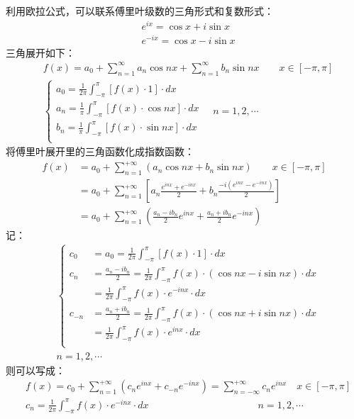 利用欧拉公式，可以联系傅里叶级数的三角形式和复数形式：
\begin{align*}
&e^{ix}=\cos x+i\sin x \\
&e^{-ix}=\cos x-i\sin x
\end{align*}
三角展开如下：
\begin{align*}
&f\left( x \right) =a_0+\sum_{n=1}^{\infty}{a_n\cos nx}+\sum_{n=1}^{\infty}{b_n\sin nx} \qquad x\in \left[ -\pi ,\pi \right] \\
&\begin{cases}
	a_0=\frac{1}{2\pi}\int_{-\pi}^{\pi}{\left[ f\left( x \right) \cdot 1 \right] \cdot dx}\\
	a_n=\frac{1}{\pi}\int_{-\pi}^{\pi}{\left[ f\left( x \right) \cdot \cos nx \right] \cdot dx}\\
	b_n=\frac{1}{\pi}\int_{-\pi}^{\pi}{\left[ f\left( x \right) \cdot \sin nx \right] \cdot dx}\\
\end{cases} \quad n=1,2,\cdots
\end{align*}
将傅里叶展开里的三角函数化成指数函数：
\begin{align*}
f\left( x \right) &=a_0+\sum_{n=1}^{+\infty}{\left( a_n\cos nx+b_n\sin nx \right)} \qquad x\in \left[ -\pi ,\pi \right] \\
&=a_0+\sum_{n=1}^{+\infty}{\left[ a_n\frac{e^{inx}+e^{-inx}}{2}+b_n\frac{-i\left( e^{inx}-e^{-inx} \right)}{2} \right]} \\
&=a_0+\sum_{n=1}^{+\infty}{\left( \frac{a_n-ib_n}{2}e^{inx}+\frac{a_n+ib_n}{2}e^{-inx} \right)}
\end{align*}
记：
\begin{align*}
&\left\{ \begin{aligned}
	c_0&=a_0=\frac{1}{2\pi}\int_{-\pi}^{\pi}{\left[ f\left( x \right) \cdot 1 \right] \cdot dx}\\
	c_n&=\frac{a_n-ib_n}{2}=\frac{1}{2\pi}\int_{-\pi}^{\pi}{f\left( x \right) \cdot \left( \cos nx-i\sin nx \right) \cdot dx}\\
	&=\frac{1}{2\pi}\int_{-\pi}^{\pi}{f\left( x \right) \cdot e^{-inx}\cdot dx}\\
	c_{-n}&=\frac{a_n+ib_n}{2}=\frac{1}{2\pi}\int_{-\pi}^{\pi}{f\left( x \right) \cdot \left( \cos nx+i\sin nx \right) \cdot dx}\\
	&=\frac{1}{2\pi}\int_{-\pi}^{\pi}{f\left( x \right) \cdot e^{inx}\cdot dx}\\
\end{aligned} \right. \\
&n=1,2,\cdots
\end{align*}
则可以写成：
\begin{align*}
&f\left( x \right) =c_0+\sum_{n=1}^{+\infty}{\left( c_ne^{inx}+c_{-n}e^{-inx} \right)}=\sum_{n=-\infty}^{+\infty}{c_ne^{inx}} \quad x\in \left[ -\pi ,\pi \right] \\
&c_n=\frac{1}{2\pi}\int_{-\pi}^{\pi}{f\left( x \right) \cdot e^{-inx}\cdot dx} \qquad \qquad \qquad \qquad \qquad \quad n=1,2,\cdots
\end{align*}

